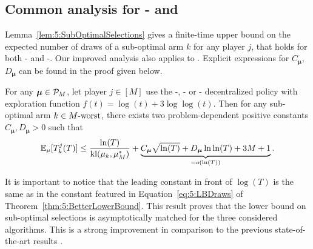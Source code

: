 \subsection{Common analysis for \RandTopM- and \MCTopM}\label{sub:5:UpperBoundSelections}

Lemma~\ref{lem:5:SubOptimalSelections} gives a finite-time upper bound on the expected number of draws of a sub-optimal arm $k$ for any player $j$, that
holds for both \RandTopM-\klUCB{} and \MCTopM-\klUCB.
Our improved analysis also applies to \rhoRand{}.
Explicit expressions for $C_{\boldsymbol{\mu}}$, $D_{\boldsymbol{\mu}}$ can be found in the proof given below.

\begin{lemma}\label{lem:5:SubOptimalSelections}
\begin{leftbar}[lemmabar]  %
  For any $\boldsymbol{\mu}\in\mathcal{P}_M$,
  let player $j\in[M]$ use the \RandTopM-, \MCTopM- or \rhoRand-\klUCB{}
  decentralized policy with exploration function $f(t) = \log(t) + 3 \log\log(t)$.
  Then for any sub-optimal arm $k \in M\text{-}\mathrm{worst}$, there exists two problem-dependent positive constants $C_{\boldsymbol{\mu}}, D_{\boldsymbol{\mu}} > 0$ such that
  \begin{equation}\label{eq:5:SubOptimalSelections}
      \mathbb{E}_{\mu}[T_k^j(T)] \leq
      \frac{\ln(T)}{\mathrm{kl}(\mu_k,\mu_{M}^*)}
      + \underbrace{C_{\boldsymbol{\mu}} \sqrt{\ln(T)} + D_{\boldsymbol{\mu}}\ln\ln(T) + 3M + 1}_{= \mathop{}\mathopen{}o\mathopen{}\left(\ln(T)\right)}.
  \end{equation}
\end{leftbar}  %
\end{lemma}

It is important to notice that the leading constant in front of $\log(T)$ is the same as in the constant featured in Equation~\eqref{eq:5:LBDraws} of Theorem~\ref{thm:5:BetterLowerBound}. This result proves that the lower bound on sub-optimal selections is asymptotically matched for the three considered algorithms. This is a strong improvement in comparison to the previous state-of-the-art results
\citep{Zhao10,Anandkumar11}.

